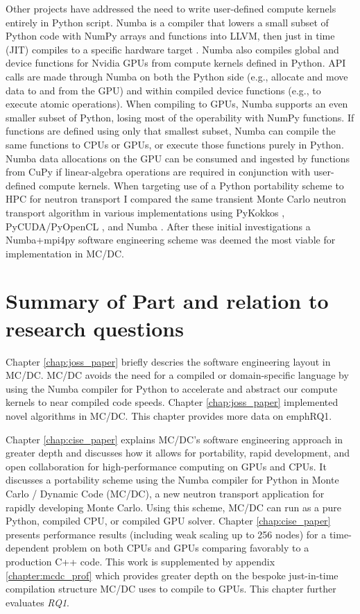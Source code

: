 Other projects have addressed the need to write user-defined compute kernels entirely in Python script.
Numba is a compiler that lowers a small subset of Python code with NumPy arrays and functions into LLVM, then just in time (JIT) compiles to a specific hardware target \cite{lam_numba_2015}. 
Numba also compiles global and device functions for Nvidia GPUs from compute kernels defined in Python.
API calls are made through Numba on both the Python side (e.g., allocate and move data to and from the GPU) and within compiled device functions (e.g., to execute atomic operations).
When compiling to GPUs, Numba supports an even smaller subset of Python, losing most of the operability with NumPy functions.
If functions are defined using only that smallest subset, Numba can compile the same functions to CPUs or GPUs, or execute those functions purely in Python.
Numba data allocations on the GPU can be consumed and ingested by functions from CuPy if linear-algebra operations are required in conjunction with user-defined compute kernels.
When targeting use of a Python portability scheme to HPC for neutron transport I compared the same transient Monte Carlo neutron transport algorithm in various implementations using PyKokkos \cite{AlAwarETAL21PyKokkos}, PyCUDA/PyOpenCL \cite{kloeckner_pycuda_2012}, and Numba \cite{morgan2022}.
After these initial investigations a Numba+mpi4py software engineering scheme was deemed the most viable for implementation in MC/DC.


\section{Summary of Part and relation to research questions}


Chapter \ref{chap:joss_paper} briefly descries the software engineering layout in MC/DC. MC/DC avoids the need for a compiled or domain-specific language by using the Numba compiler for Python to accelerate and abstract our compute kernels to near compiled code speeds.
Chapter \ref{chap:joss_paper} implemented novel algorithms in MC/DC.
This chapter provides more data on emph{RQ1}.

Chapter \ref{chap:cise_paper} explains MC/DC's software engineering approach in greater depth and discusses how it allows for portability, rapid development, and open collaboration for high-performance computing on GPUs and CPUs. 
It discusses a portability scheme using the Numba compiler for Python in Monte Carlo / Dynamic Code (MC/DC), a new neutron transport application for rapidly developing Monte Carlo. 
Using this scheme, MC/DC can run as a pure Python, compiled CPU, or compiled GPU solver. 
Chapter \ref{chap:cise_paper} presents performance results (including weak scaling up to 256 nodes) for a time-dependent problem on both CPUs and GPUs comparing favorably to a production C++ code.
This work is supplemented by appendix \ref{chapter:mcdc_prof} which provides greater depth on the bespoke just-in-time compilation structure MC/DC uses to compile to GPUs.
This chapter further evaluates \emph{RQ1}.

